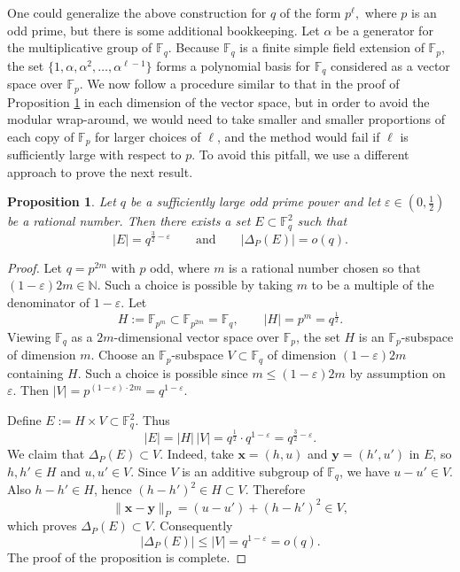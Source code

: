 \documentclass{article}
\newtheorem{proposition}[theorem]{Proposition}
\newcommand{\F}{\mathbb{F}}
\newcommand{\1}{\mathbf{1}}
\begin{document}
    One could generalize the above construction for $q$ of the form $p^\ell,$ where $p$ is an odd prime, but there is some additional bookkeeping. Let $\alpha$ be a generator for the multiplicative group of $\mathbb F_q.$ Because $\mathbb F_q$ is a finite simple field extension of $\mathbb F_p,$ the set $\{1, \alpha, \alpha^2, \dots, \alpha^{\ell-1}\}$ forms a polynomial basis for $\mathbb F_q$ considered as a vector space over $\mathbb F_p.$ We now follow a procedure similar to that in the proof of Proposition \ref{prop:prime-power-counterexample} in each dimension of the vector space, but in order to avoid the modular wrap-around, we would need to take smaller and smaller proportions of each copy of $\mathbb F_p$ for larger choices of $\ell$, and the method would fail if $\ell$ is sufficiently large with respect to $p$. To avoid this pitfall, we use a different approach to prove the next result.

\begin{proposition}\label{prop:prime-power-counterexample}
Let $q$ be a sufficiently large odd prime power and let $\varepsilon\in(0,\tfrac12)$ be a rational number.
Then there exists a set $E\subset \F_q^2$ such that
\[
|E| = q^{\frac{3}{2}-\varepsilon}
\qquad\text{and}\qquad
|\Delta_P(E)|=o(q).
\]
\end{proposition}

\begin{proof}
Let $q=p^{2m}$ with $p$ odd, where $m$ is a rational number chosen so that $(1-\varepsilon)2m\in\mathbb{N}$.
Such a choice is possible by taking $m$ to be a multiple of the denominator of $1-\varepsilon$.
Let
\[
H:=\F_{p^{m}}\subset \F_{p^{2m}}=\F_q,
\qquad |H|=p^m=q^{\frac{1}{2}}.
\]
Viewing $\F_q$ as a $2m$-dimensional vector space over $\F_p$, the set $H$ is an $\F_p$-subspace of dimension $m$.
Choose an $\F_p$-subspace $V\subset\F_q$ of dimension $(1-\varepsilon)2m$
containing $H$. Such a choice is possible since $m\le (1-\varepsilon)2m$ by assumption on $\varepsilon$.  
Then $|V| = p^{(1-\varepsilon)\cdot 2m} = q^{1-\varepsilon}$.

Define $E:=H\times V \subset \F_q^2$.
Thus 
\[
|E| = |H| \, |V| = q^{\frac{1}{2}}\cdot q^{1-\varepsilon} = q^{\frac{3}{2}-\varepsilon}. 
\]
We claim that $\Delta_P(E)\subset V$.
Indeed, take $\mathbf{x}=(h,u)$ and $\mathbf{y}=(h',u')$ in $E$, so $h,h'\in H$ and $u,u'\in V$.
Since $V$ is an additive subgroup of $\F_q$, we have $u-u'\in V$.
Also $h-h'\in H$, hence $(h-h')^2\in H\subset V$.
Therefore
\[
\|\mathbf{x}-\mathbf{y}\|_P
=(u-u')+(h-h')^2
\in V,
\]
which proves $\Delta_P(E)\subset V$.
Consequently
\[
|\Delta_P(E)|\le |V|=q^{1-\varepsilon}=o(q).
\]
The proof of the proposition is complete.
\end{proof}
\end{document}
